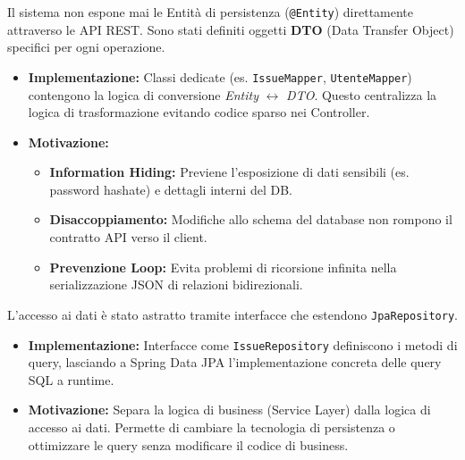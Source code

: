 \documentclass[a4paper,12pt]{article}
\begin{document}
\vspace{0.5cm}

\begin{tcolorbox}[
    enhanced,
    colback=BoxLight,
    colframe=UninaBlue,
    boxrule=0.8pt,
    arc=3pt,
    sharp corners,
    title=2. Pattern DTO e Mapper (Object Mapping),
    fonttitle=\bfseries,
    coltitle=white,
    breakable
]
Il sistema non espone mai le Entità di persistenza (\texttt{@Entity}) direttamente attraverso le API REST. Sono stati definiti oggetti \textbf{DTO} (Data Transfer Object) specifici per ogni operazione.
\begin{itemize}
    \item \textbf{Implementazione:} Classi dedicate (es. \texttt{IssueMapper}, \texttt{UtenteMapper}) contengono la logica di conversione \textit{Entity} $\leftrightarrow$ \textit{DTO}. Questo centralizza la logica di trasformazione evitando codice sparso nei Controller.
    \item \textbf{Motivazione:}
    \begin{itemize}
        \item \textbf{Information Hiding:} Previene l'esposizione di dati sensibili (es. password hashate) e dettagli interni del DB.
        \item \textbf{Disaccoppiamento:} Modifiche allo schema del database non rompono il contratto API verso il client.
        \item \textbf{Prevenzione Loop:} Evita problemi di ricorsione infinita nella serializzazione JSON di relazioni bidirezionali.
    \end{itemize}
\end{itemize}
\end{tcolorbox}

\newpage

\begin{tcolorbox}[
    enhanced,
    colback=BoxLight,
    colframe=UninaBlue,
    boxrule=0.8pt,
    arc=3pt,
    sharp corners,
    title=3. Repository Pattern (Data Access),
    fonttitle=\bfseries,
    coltitle=white,
    breakable
]
L'accesso ai dati è stato astratto tramite interfacce che estendono \texttt{JpaRepository}.
\begin{itemize}
    \item \textbf{Implementazione:} Interfacce come \texttt{IssueRepository} definiscono i metodi di query, lasciando a Spring Data JPA l'implementazione concreta delle query SQL a runtime.
    \item \textbf{Motivazione:} Separa la logica di business (Service Layer) dalla logica di accesso ai dati. Permette di cambiare la tecnologia di persistenza o ottimizzare le query senza modificare il codice di business.
\end{itemize}
\end{tcolorbox}
\end{document}
